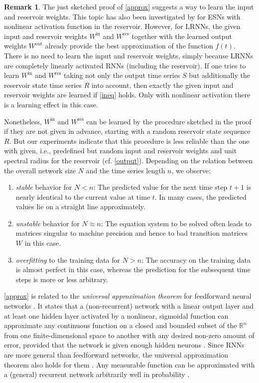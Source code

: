 \documentclass[twoside,11pt]{article}
\theoremstyle{definition}
\newtheorem{remk}{Remark}
\begin{document}
\begin{remk}
The just sketched proof of \cref{approx} suggests a way to learn the input
and reservoir weights. This topic has also been investigated by \citet{PDW13} for
ESNs with nonlinear activation function in the reservoir. However, for LRNNs, the
given input and reservoir weights $W^\mathrm{in}$ and $W^\mathrm{res}$ together
with the learned output weights $W^\mathrm{out}$ already provide the best
approximation of the function $f(t)$. There is no need to learn the input and
reservoir weights, simply because LRNNs are
completely linearly activated RNNs (including the reservoir). If one tries to
learn $W^\mathrm{in}$ and $W^\mathrm{res}$ taking not only the output time
series $S$ but additionally the reservoir state time series $R$ into account,
then exactly the given input and reservoir weights are learned if \cref{ineq}
holds. Only with nonlinear activation there is a learning effect in this case.

Nonetheless, $W^\mathrm{in}$ and $W^\mathrm{res}$ can be learned by the
procedure sketched in the proof if they are not given in advance, starting with
a random reservoir state sequence $R$. But our experiments indicate that this
procedure is less reliable than the one with given, i.e., predefined but random
input and reservoir weights and unit spectral radius for the reservoir (cf.
\cref{output}). Depending on the relation between the overall network size $N$
and the time series length $n$, we observe:
\begin{enumerate}
  \item \emph{stable} behavior for $N < n$: The predicted value for
	the next time step $t+1$ is nearly identical to the current value at
	time $t$. In many cases, the predicted values lie on a straight line
	approximately.
  \item \emph{unstable} behavior for $N \approx n$: The equation system to be
	solved often leads to matrices singular to machine precision and hence
	to bad transition matrices $W$ in this case.
  \item \emph{overfitting} to the training data for $N > n$: The accuracy on the
	training data is almost perfect in this case, whereas the prediction for
	the subsequent time steps is more or less arbitrary.
\end{enumerate}
\end{remk}

\cref{approx} is related to the \emph{universal approximation theorem} for
feedforward neural networks \citep{Hor91}. It states that a (non-recurrent)
network with a linear output layer and at least one hidden layer activated by a
nonlinear, sigmoidal function can approximate any continuous function on a
closed and bounded subset of the $\mathbb{R}^n$ from one finite-dimensional
space to another with any desired non-zero amount of error, provided that the
network is given enough hidden neurons \citep[Sect.~6.4.1]{GBC16}. Since RNNs
are more general than feedforward networks, the universal approximation theorem
also holds for them \citep{MNM02}. Any measurable function can be
approximated with a (general) recurrent network arbitrarily well in probability
\citep{Ham00}.
\end{document}
